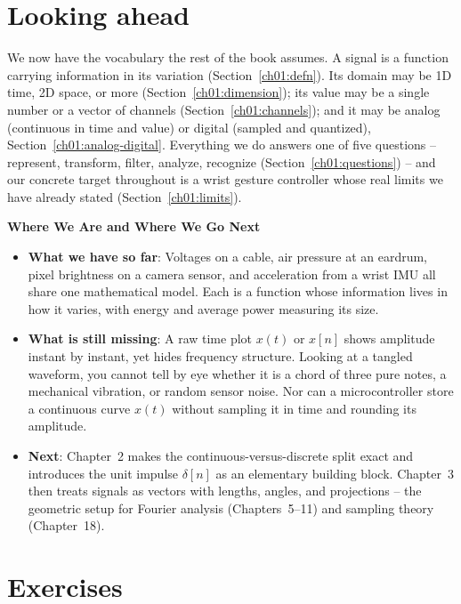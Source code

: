\section{Looking ahead}
\label{ch01:ahead}

We now have the vocabulary the rest of the book assumes. A signal is a function carrying
information in its variation (Section~\ref{ch01:defn}). Its domain may be 1D time, 2D space, or
more (Section~\ref{ch01:dimension}); its value may be a single number or a vector of channels
(Section~\ref{ch01:channels}); and it may be analog (continuous in time and value) or digital
(sampled and quantized), Section~\ref{ch01:analog-digital}. Everything we do answers one of five
questions -- represent, transform, filter, analyze, recognize (Section~\ref{ch01:questions}) --
and our concrete target throughout is a wrist gesture controller whose real limits we have
already stated (Section~\ref{ch01:limits}).

\begin{connectionbox}
\textbf{Where We Are and Where We Go Next}
\begin{itemize}
  \item \textbf{What we have so far}: Voltages on a cable, air pressure at an eardrum, pixel
  brightness on a camera sensor, and acceleration from a wrist IMU all share one mathematical
  model. Each is a function whose information lives in how it varies, with energy and average power
  measuring its size.
  \item \textbf{What is still missing}: A raw time plot $x(t)$ or $x[n]$ shows amplitude instant
  by instant, yet hides frequency structure. Looking at a tangled waveform, you cannot tell by eye
  whether it is a chord of three pure notes, a mechanical vibration, or random sensor noise. Nor
  can a microcontroller store a continuous curve $x(t)$ without sampling it in time and rounding
  its amplitude.
  \item \textbf{Next}: Chapter~2 makes the continuous-versus-discrete split exact and introduces
  the unit impulse $\delta[n]$ as an elementary building block. Chapter~3 then treats signals as
  vectors with lengths, angles, and projections -- the geometric setup for Fourier analysis
  (Chapters~5--11) and sampling theory (Chapter~18).
\end{itemize}
\end{connectionbox}

\section{Exercises}
\label{ch01:exercises}

